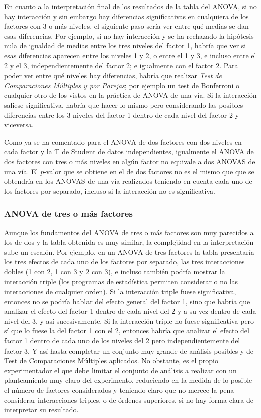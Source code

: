 En cuanto a la interpretación final de los resultados de la tabla del ANOVA, si no hay interacción y sin embargo hay
diferencias significativas en cualquiera de los factores con 3 o más niveles, el siguiente paso sería ver entre qué
medias se dan esas diferencias. Por ejemplo, si no hay interacción y se ha rechazado la hipótesis nula de igualdad de
medias entre los tres niveles del factor 1, habría que ver si esas diferencias aparecen entre los niveles 1 y 2, o entre
el 1 y 3, e incluso entre el 2 y el 3, independientemente del factor 2; e igualmente con el factor 2. Para poder ver
entre qué niveles hay diferencias, habría que realizar \emph{Test de Comparaciones Múltiples y por Parejas}; por ejemplo
un test de Bonferroni o cualquier otro de los vistos en la práctica de ANOVA de una vía. Si la interacción saliese
significativa, habría que hacer lo mismo pero considerando las posibles diferencias entre los 3 niveles del factor 1
dentro de cada nivel del factor 2 y viceversa.

Como ya se ha comentado para el ANOVA de dos factores con dos niveles en cada factor y la T de Student de datos
independientes, igualmente el ANOVA de dos factores con tres o más niveles en algún factor no equivale a dos ANOVAS de
una vía. El $p$-valor que se obtiene en el de dos factores no es el mismo que que se obtendría en los ANOVAS de una vía
realizados teniendo en cuenta cada uno de los factores por separado, incluso si la interacción no es significativa.


\subsubsection{ANOVA de tres o más factores}
Aunque los fundamentos del ANOVA de tres o más factores son muy parecidos a los de dos y la tabla obtenida es muy
similar, la complejidad en la interpretación sube un escalón. Por ejemplo, en un ANOVA de tres factores la tabla
presentaría los tres efectos de cada uno de los factores por separado, las tres interacciones dobles (1 con 2, 1 con 3 y
2 con 3), e incluso también podría mostrar la interacción triple (los programas de estadística permiten considerar o no
las interacciones de cualquier orden). Si la interacción triple fuese significativa, entonces no se podría hablar del
efecto general del factor 1, sino que habría que analizar el efecto del factor 1 dentro de cada nivel del 2 y a su vez
dentro de cada nivel del 3, y así sucesivamente. Si la interacción triple no fuese significativa pero sí que lo fuese la
del factor 1 con el 2, entonces habría que analizar el efecto del factor 1 dentro de cada uno de los niveles del 2 pero
independientemente del factor 3. Y así hasta completar un conjunto muy grande de análisis posibles y de Test de
Comparaciones Múltiples aplicados. No obstante, es el propio experimentador el que debe limitar el conjunto de análisis
a realizar con un planteamiento muy claro del experimento, reduciendo en la medida de lo posible el número de factores
considerados y teniendo claro que no merece la pena considerar interacciones triples, o de órdenes superiores, si no hay
forma clara de interpretar su resultado.

